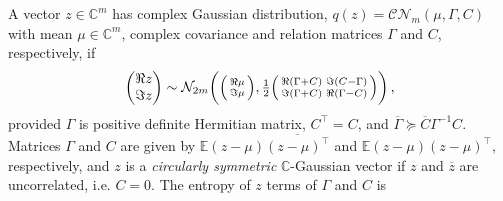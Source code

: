 \documentclass[a4paper,10pt,twocolumn]{article}
\newcommand{\cplx}{\mathbb{C}}
\newcommand{\hop}{{\mkern-1.5mu\dagger}}
\newcommand{\conj}[1]{\overline{#1}}
\begin{document}
A vector $z\in \cplx^m$ has complex Gaussian distribution, $
  q(z) = \mathcal{C}\mathcal{N}_m(\mu, \Gamma, C)
$ with mean $\mu \in \cplx^m$, complex covariance and relation matrices $\Gamma$ and $C$,
respectively, if
\begin{equation}  \label{eq:cn-paired-real-density}
  \begin{pmatrix}
    \Re z \\ \Im z
  \end{pmatrix}
    \sim \mathcal{N}_{2 m}\biggl(
      \Bigl(
        \begin{smallmatrix}
          \Re \mu \\ \Im \mu
        \end{smallmatrix}
      \Bigr),
      \tfrac12 \Bigl(
        \begin{smallmatrix}
          \Re{(\Gamma + C)} & \Im{(C - \Gamma)} \\
          \Im{(\Gamma + C)} & \Re{(\Gamma - C)}
        \end{smallmatrix}
      \Bigr)
    \biggr)
    \,,
\end{equation}
provided $\Gamma$ is positive definite Hermitian matrix, $C^\top = C$, and $
  \conj{\Gamma} \succeq \conj{C} \Gamma^{-1} C
$.
%
Matrices $\Gamma$ and $C$ are given by $
  \mathbb{E} (z - \mu)\conj{(z - \mu)^\top}
$ and $
  \mathbb{E} (z - \mu)(z - \mu)^{\top}
$, respectively, and $z$ is a \emph{circularly symmetric} $\cplx$-Gaussian vector
if $z$ and $\conj{z}$ are uncorrelated, i.e. $C = 0$.
%
The entropy of $z$ terms of $\Gamma$ and $C$ is
\end{document}
